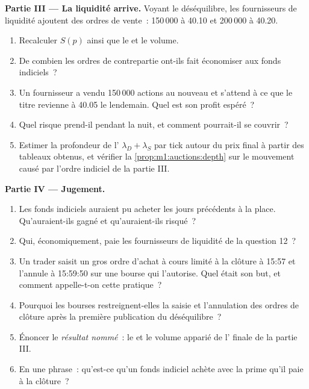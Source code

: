 \begin{problem}
\medskip\noindent\textbf{Partie III --- La liquidité arrive.}
Voyant le déséquilibre, les fournisseurs de liquidité ajoutent des ordres de vente~: 150\,000 à 40.10
et 200\,000 à 40.20.
\begin{enumerate}[resume]
\item Recalculer $S(p)$ ainsi que le  et le volume.
\item De combien les ordres de contrepartie ont-ils fait économiser aux fonds indiciels~?
\item Un fournisseur a vendu 150\,000 actions au nouveau  et s'attend à ce que le titre
revienne à 40.05 le lendemain. Quel est son profit espéré~?
\item Quel risque prend-il pendant la nuit, et comment pourrait-il se couvrir~?
\item Estimer la profondeur de l' $\lambda_D + \lambda_S$ par tick autour du
prix final à partir des tableaux obtenus, et vérifier la \cref{prop:m1:auctions:depth} sur
le mouvement causé par l'ordre indiciel de la partie III.
\end{enumerate}

\medskip\noindent\textbf{Partie IV --- Jugement.}
\begin{enumerate}[resume]
\item Les fonds indiciels auraient pu acheter les jours précédents à la place.
Qu'auraient-ils gagné et qu'auraient-ils risqué~?
\item Qui, économiquement, paie les fournisseurs de liquidité de la question 12~?
\item Un trader saisit un gros ordre d'achat à cours limité à la clôture à 15:57 et
l'annule à 15:59:50 sur une bourse qui l'autorise. Quel était son but, et comment
appelle-t-on cette pratique~?
\item Pourquoi les bourses restreignent-elles la saisie et l'annulation des ordres de clôture
après la première publication du déséquilibre~?
\item Énoncer le \emph{résultat nommé}~: le  et le volume apparié
de l' finale de la partie III.
\item En une phrase~: qu'est-ce qu'un fonds indiciel achète avec la prime qu'il paie
à la clôture~?
\end{enumerate}
\end{problem}

